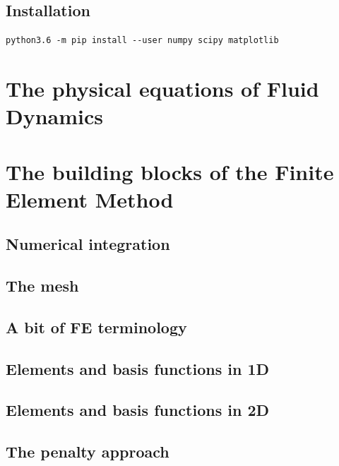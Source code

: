 \documentclass[a4paper]{article}
\begin{document}
\subsection{Installation}

\begin{verbatim}
python3.6 -m pip install --user numpy scipy matplotlib
\end{verbatim}

\newpage
\section{The physical equations of Fluid Dynamics}


\newpage
\section{The building blocks of the Finite Element Method}

\subsection{Numerical integration}


\subsection{The mesh}

\subsection{A bit of FE terminology}


\subsection{Elements and basis functions in 1D}




\subsection{Elements and basis functions in 2D}



\subsection{The penalty approach}

\end{document}
